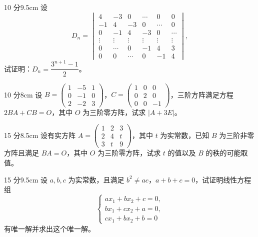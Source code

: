 
\begin{problem}{10 分}{9.5cm}
设
\[
D_n=\begin{vmatrix}
4&-3&0&\cdots&0&0\\
-1&4&-3&0&\cdots&0\\
0&-1&4&-3&0&\cdots\\
\vdots&\vdots&\vdots&\vdots&\vdots&\vdots\\
0&\cdots&0&-1&4&3\\
0&0&\cdots&0&-1&4
\end{vmatrix},
\]
试证明：$D_n=\dfrac{3^{n+1}-1}{2}$。
\end{problem}

\begin{problem}{10 分}{8cm}
设 $B=\begin{pmatrix}1&-5&1\\0&-1&0\\2&-2&3\end{pmatrix}$，$C=\begin{pmatrix}1&0&0\\0&2&0\\0&0&-1\end{pmatrix}$，三阶方阵满足方程 $2BA+CB=O$，其中 $O$ 为三阶零方阵，试求 $|A+3E|$。
\end{problem}

\begin{problem}{15 分}{8.5cm}
设有实方阵 $A=\begin{pmatrix}1&2&3\\2&4&t\\3&t&9\end{pmatrix}$，其中 $t$ 为实常数，已知 $B$ 为三阶非零方阵且满足 $BA=O$，其中 $O$ 为三阶零方阵，试求 $t$ 的值以及 $B$ 的秩的可能取值。
\end{problem}

\begin{problem}{15 分}{9.5cm}
设 $a,b,c$ 为实常数，且满足 $b^{2}\ne ac$，$a+b+c=0$，试证明线性方程组
\[
\begin{cases}
ax_1+bx_2+c=0,\\
bx_1+cx_2+a=0,\\
cx_1+bx_2+b=0
\end{cases}
\]
有唯一解并求出这个唯一解。
\end{problem}

